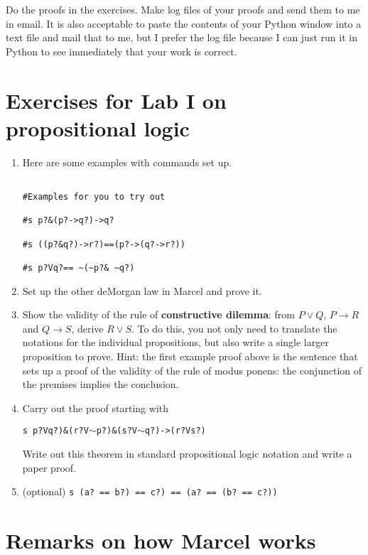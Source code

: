 \documentclass[12pt]{article}
\begin{document}
Do the proofs in the exercises.  Make log files of your proofs and send them to me in email.  It is also acceptable to paste the contents of your Python window into a text file and mail that to me, but I prefer the log file because I can just run it in Python to see immediately that your work is correct.

\section{Exercises for Lab I on propositional logic}

\begin{enumerate}

\item Here are some examples with commands set up.

\begin{verbatim}

#Examples for you to try out

#s p?&(p?->q?)->q?

#s ((p?&q?)->r?)==(p?->(q?->r?))

#s p?Vq?== ~(~p?& ~q?)

\end{verbatim}

\item Set up the other deMorgan law in Marcel and prove it.

\item Show the validity of the rule of {\bf constructive dilemma}:  from $P \vee Q$, $P \rightarrow R$ and $Q \rightarrow S$, derive $R \vee S$.  To do this, you not only need to translate the 
notations for the individual propositions, but also write a single larger proposition to prove.  Hint:  the first example proof above is the sentence
that sets up a proof of the validity of the rule of modus ponens:  the conjunction of the premises implies the conclusion.

\item Carry out the proof starting with 

{\tt s p?Vq?)\&(r?V$\sim$p?)\&(s?V$\sim$q?)->(r?Vs?)}

Write out this theorem in standard propositional logic notation and write a paper proof.

\item (optional) {\tt s (a? == b?) == c?) == (a? == (b? == c?))}

\end{enumerate}

\section{Remarks on how Marcel works}
\end{document}
